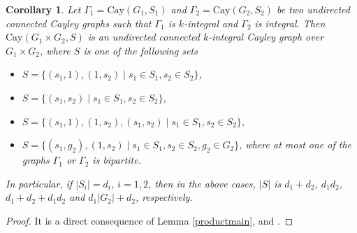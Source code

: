 \documentclass[12pt,a4paper]{article}
\newtheorem{core}[thm]{Corollary}
\def \geq {\geqslant}
\begin{document}
	\begin{core}\label{productCay}
		Let $\Gamma_1=\mathrm{Cay}(G_1,S_1)$ and $\Gamma_2=\mathrm{Cay}(G_2,S_2)$ be two undirected connected Cayley graphs such that $\Gamma_1$ is $k$-integral and $\Gamma_2$ is integral. Then $\mathrm{Cay}(G_1\times G_2,S)$ is an undirected connected $k$-integral Cayley graph over $G_1\times G_2$, where $S$ is one of the following sets
		
		\begin{itemize}
			\item[$(1)$] $S=\{(s_1,1),(1,s_2)\mid s_1\in S_1,s_2\in S_2\}$,
			\item[$(2)$] $S=\{(s_1,s_2)\mid s_1\in S_1,s_2\in S_2\}$,
			\item[$(3)$] $S=\{(s_1,1),(1,s_2),(s_1,s_2)\mid s_1\in S_1,s_2\in S_2\}$,
			\item[$(4)$] $S=\{(s_1,g_2), (1,s_2)\mid s_1\in S_1,s_2\in S_2,g_2\in G_2\}$, where at most one of the graphs $\Gamma_1$ or $\Gamma_2$ is bipartite.
		\end{itemize}
		
		In particular, if $|S_i|=d_i$, $i=1,2$, then in the above cases, $|S|$ is $d_1+d_2$, $d_1d_2$, $d_1+d_2+d_1d_2$ and $d_1|G_2|+d_2$, respectively.
	\end{core}
	\begin{proof}
		It is a direct consequence of Lemma \ref{productmain}, \cite[Corollaries 5.3, 5.6, 5.10, 5.14]{HIK} and \cite[Theorems 3.1,  4.1,  5.3,  6.1]{AL}.
	\end{proof}
	
\end{document}
